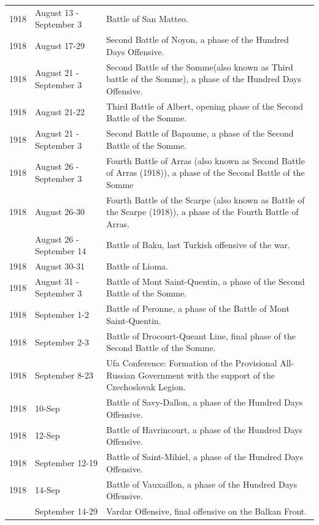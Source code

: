 \documentclass[
  openany]{book}
\begin{document}
\begin{longtable}[t]{rl>{\raggedright\arraybackslash}p{22em}}
\rowcolor{gray!6}  1918 & August 13 - September 3 & Battle of San Matteo.\\
1918 & August 17-29 & Second Battle of Noyon, a phase of the Hundred Days Offensive.\\
\addlinespace
\rowcolor{gray!6}  1918 & August 21 - September 3 & Second Battle of the Somme(also known as Third battle of the Somme), a phase of the Hundred Days Offensive.\\
1918 & August 21-22 & Third Battle of Albert, opening phase of the Second Battle of the Somme.\\
\rowcolor{gray!6}  1918 & August 21 - September 3 & Second Battle of Bapaume, a phase of the Second Battle of the Somme.\\
1918 & August 26 - September 3 & Fourth Battle of Arras (also known as Second Battle of Arras (1918)), a phase of the Second Battle of the Somme\\
\rowcolor{gray!6}  1918 & August 26-30 & Fourth Battle of the Scarpe (also known as Battle of the Scarpe (1918)), a phase of the Fourth Battle of Arras.\\
\addlinespace
1918 & August 26 - September 14 & Battle of Baku, last Turkish offensive of the war.\\
\rowcolor{gray!6}  1918 & August 30-31 & Battle of Lioma.\\
1918 & August 31 - September 3 & Battle of Mont Saint-Quentin, a phase of the Second Battle of the Somme.\\
\rowcolor{gray!6}  1918 & September 1-2 & Battle of Peronne, a phase of the Battle of Mont Saint-Quentin.\\
1918 & September 2-3 & Battle of Drocourt-Queant Line, final phase of the Second Battle of the Somme.\\
\addlinespace
\rowcolor{gray!6}  1918 & September 8-23 & Ufa Conference: Formation of the Provisional All-Russian Government with the support of the Czechoslovak Legion.\\
1918 & 10-Sep & Battle of Savy-Dallon, a phase of the Hundred Days Offensive.\\
\rowcolor{gray!6}  1918 & 12-Sep & Battle of Havrincourt, a phase of the Hundred Days Offensive.\\
1918 & September 12-19 & Battle of Saint-Mihiel, a phase of the Hundred Days Offensive.\\
\rowcolor{gray!6}  1918 & 14-Sep & Battle of Vauxaillon, a phase of the Hundred Days Offensive.\\
\addlinespace
1918 & September 14-29 & Vardar Offensive, final offensive on the Balkan Front.\\

\end{longtable}
\end{document}
